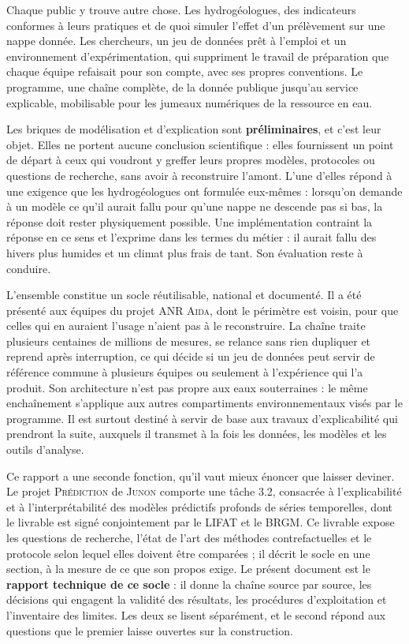 Chaque public y trouve autre chose. Les hydrogéologues, des indicateurs conformes à leurs
pratiques et de quoi simuler l'effet d'un prélèvement sur une nappe donnée. Les chercheurs, un
jeu de données prêt à l'emploi et un environnement d'expérimentation, qui suppriment le travail de
préparation que chaque équipe refaisait pour son compte, avec ses propres conventions. Le
programme, une chaîne complète, de la donnée publique jusqu'au service explicable, mobilisable
pour les jumeaux numériques de la ressource en eau.

Les briques de modélisation et d'explication sont \textbf{préliminaires}, et c'est leur objet.
Elles ne portent aucune conclusion scientifique : elles fournissent un point de départ à ceux qui
voudront y greffer leurs propres modèles, protocoles ou questions de recherche, sans avoir à
reconstruire l'amont. L'une d'elles répond à une exigence que les hydrogéologues ont formulée
eux-mêmes : lorsqu'on demande à un modèle ce qu'il aurait fallu pour qu'une nappe ne descende
pas si bas, la réponse doit rester physiquement possible. Une implémentation contraint la
réponse en ce sens et l'exprime dans les termes du métier : il aurait fallu des hivers plus
humides et un climat plus frais de tant. Son évaluation reste à conduire.

L'ensemble constitue un socle réutilisable, national et documenté. Il a été présenté aux équipes
du projet ANR \textsc{Aida}, dont le périmètre est voisin, pour que celles qui en auraient
l'usage n'aient pas à le reconstruire. La chaîne traite plusieurs
centaines de millions de mesures, se relance sans rien dupliquer et reprend après interruption,
ce qui décide si un jeu de données peut servir de référence commune à plusieurs équipes ou
seulement à l'expérience qui l'a produit. Son architecture n'est pas propre aux eaux
souterraines : le même enchaînement s'applique aux autres compartiments environnementaux visés
par le programme. Il est surtout destiné à servir de base aux travaux d'explicabilité qui
prendront la suite, auxquels il transmet à la fois les données, les modèles et les outils
d'analyse.

Ce rapport a une seconde fonction, qu'il vaut mieux énoncer que laisser deviner. Le projet
\textsc{Prédiction} de \textsc{Junon} comporte une tâche 3.2, consacrée à l'explicabilité et à
l'interprétabilité des modèles prédictifs profonds de séries temporelles, dont le livrable est
signé conjointement par le LIFAT et le BRGM. Ce livrable expose les questions de recherche, l'état
de l'art des méthodes contrefactuelles et le protocole selon lequel elles doivent être comparées ;
il décrit le socle en une section, à la mesure de ce que son propos exige. Le présent document est
le \textbf{rapport technique de ce socle} : il donne la chaîne source par source, les décisions
qui engagent la validité des résultats, les procédures d'exploitation et l'inventaire des limites.
Les deux se lisent séparément, et le second répond aux questions que le premier laisse ouvertes
sur la construction.

